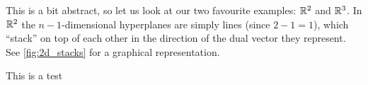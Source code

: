 This is a bit abstract, so let us look at our two favourite examples: $\Rs[2]$ and $\Rs[3]$. In $\Rs[2]$ the $n-1$-dimensional hyperplanes are simply lines (since $2-1=1$), which \enquote{stack} on top of each other in the direction of the dual vector they represent. See \cref{fig:2d_stacks} for a graphical representation.

\begin{marginfigure}
    \begin{center}
    \end{center}
    \caption{This is a test}
    \label{fig:2d_stacks}
\end{marginfigure}
